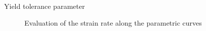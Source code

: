 \documentclass{beamer}  %
\begin{document}
\begin{frame}{Yield tolerance parameter}
    \begin{figure}
        \begin{overprint}
        \end{overprint}
        \caption*{Evaluation of the strain rate along the parametric curves}
    \end{figure}
\end{frame}
\end{document}
